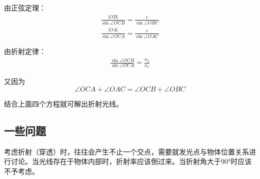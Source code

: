 \documentclass[10pt,twocolumn]{article}
\begin{document}
由正弦定理：
\begin{align}
\frac{|OB|}{\sin{\angle OCB}}=\frac{r}{\sin{\angle OBC}}\\
\frac{|OA|}{\sin{\angle OCA}}=\frac{r}{\sin{\angle OAC}}
\end{align}

由折射定律：
\begin{align}
\frac{\sin{\angle OCB}}{\sin{\angle OCA}}=\frac{n_2}{n_1}
\end{align}

又因为
\begin{equation}
\angle OCA + \angle OAC = \angle OCB + \angle OBC
\end{equation}

结合上面四个方程就可解出折射光线。

\subsection{\hei 一些问题}
考虑折射（穿透）时，往往会产生不止一个交点，需要就发光点与物体位置关系进行讨论。当光线存在于物体内部时，折射率应该倒过来。当折射角大于$90°$时应该不予考虑。
\end{document}

